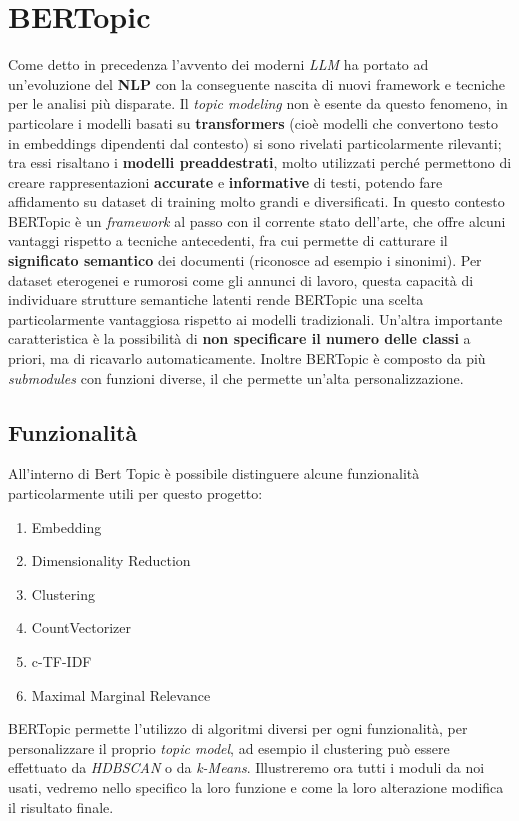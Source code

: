 \chapter{BERTopic}
Come detto in precedenza l'avvento dei moderni \emph{LLM} ha portato ad un'evoluzione del \textbf{NLP} con la conseguente nascita di nuovi framework e tecniche per le analisi più disparate.
Il \emph{topic modeling} non è esente da questo fenomeno, in particolare i modelli basati su \textbf{transformers} (cioè modelli che convertono testo in embeddings dipendenti dal contesto) si sono rivelati particolarmente rilevanti; tra essi risaltano i \textbf{modelli preaddestrati}, molto utilizzati perché permettono di creare rappresentazioni \textbf{accurate} e \textbf{informative} di testi, potendo fare affidamento su dataset di training molto grandi e diversificati.
In questo contesto BERTopic è un \textit{framework} al passo con il corrente stato dell'arte, che offre alcuni vantaggi rispetto a tecniche antecedenti, fra cui permette di catturare il \textbf{significato semantico} dei documenti (riconosce ad esempio i sinonimi). Per dataset eterogenei e rumorosi come gli annunci di lavoro, questa capacità di individuare strutture semantiche latenti rende BERTopic una scelta particolarmente vantaggiosa rispetto ai modelli tradizionali. Un'altra importante caratteristica è la possibilità di \textbf{non specificare il numero delle classi} a priori, ma di ricavarlo automaticamente.
Inoltre BERTopic è composto da più \textit{submodules} con funzioni diverse, il che permette un'alta personalizzazione.

\section{Funzionalità}
All'interno di Bert Topic è possibile distinguere alcune funzionalità particolarmente utili per questo progetto:
\begin{enumerate}
\item Embedding
\item Dimensionality Reduction
\item Clustering
\item CountVectorizer
\item c-TF-IDF
\item Maximal Marginal Relevance
\end{enumerate}

BERTopic permette l'utilizzo di algoritmi diversi per ogni funzionalità, per personalizzare il proprio \emph{topic model}, ad esempio il clustering può essere effettuato da \emph{HDBSCAN} o da \emph{k-Means}.
Illustreremo ora tutti i moduli da noi usati, vedremo nello specifico la loro funzione e come la loro alterazione modifica il risultato finale.
